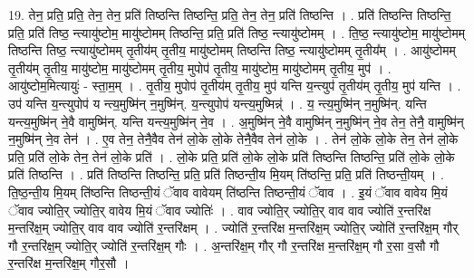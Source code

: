 \documentclass[17pt]{extarticle}
\begin{document}
19. तेन॒ प्रति॒ प्रति॒ तेन॒ तेन॒ प्रति॑ तिष्ठन्ति तिष्ठन्ति॒ प्रति॒ तेन॒ तेन॒ प्रति॑ तिष्ठन्ति । . प्रति॑ तिष्ठन्ति तिष्ठन्ति॒ प्रति॒ प्रति॑ तिष्ठ॒ न्त्यायु॑ष्टोम॒ मायु॑ष्टोमम् तिष्ठन्ति॒ प्रति॒ प्रति॑ तिष्ठ॒ न्त्यायु॑ष्टोमम् । . ति॒ष्ठ॒ न्त्यायु॑ष्टोम॒ मायु॑ष्टोमम् तिष्ठन्ति तिष्ठ॒ न्त्यायु॑ष्टोमम् तृ॒तीय॑म् तृ॒तीय॒ मायु॑ष्टोमम् तिष्ठन्ति तिष्ठ॒ न्त्यायु॑ष्टोमम् तृ॒तीय᳚म् । . आयु॑ष्टोमम् तृ॒तीय॑म् तृ॒तीय॒ मायु॑ष्टोम॒ मायु॑ष्टोमम् तृ॒तीय॒ मुपोप॑ तृ॒तीय॒ मायु॑ष्टोम॒ मायु॑ष्टोमम् तृ॒तीय॒ मुप॑ । . आयु॑ष्टोम॒मित्यायुः॑ - स्ता॒म॒म् । . तृ॒तीय॒ मुपोप॑ तृ॒तीय॑म् तृ॒तीय॒ मुप॑ यन्ति य॒न्त्युप॑ तृ॒तीय॑म् तृ॒तीय॒ मुप॑ यन्ति । . उप॑ यन्ति य॒न्त्युपोप॑ य न्त्य॒मुष्मि॑न् न॒मुष्मि॑न्. य॒न्त्युपोप॑ यन्त्य॒मुष्मिन्न्॑ । . य॒ न्त्य॒मुष्मि॑न् न॒मुष्मि॑न्. यन्ति यन्त्य॒मुष्मि॑न् ने॒वै वामुष्मि॑न्. यन्ति यन्त्य॒मुष्मि॑न् ने॒व । . अ॒मुष्मि॑न् ने॒वै वामुष्मि॑न् न॒मुष्मि॑न् ने॒व तेन॒ तेनै॒ वामुष्मि॑न् न॒मुष्मि॑न् ने॒व तेन॑ । . ए॒व तेन॒ तेनै॒वैव तेन॑ लो॒के लो॒के तेनै॒वैव तेन॑ लो॒के । . तेन॑ लो॒के लो॒के तेन॒ तेन॑ लो॒के प्रति॒ प्रति॑ लो॒के तेन॒ तेन॑ लो॒के प्रति॑ । . लो॒के प्रति॒ प्रति॑ लो॒के लो॒के प्रति॑ तिष्ठन्ति तिष्ठन्ति॒ प्रति॑ लो॒के लो॒के प्रति॑ तिष्ठन्ति । . प्रति॑ तिष्ठन्ति तिष्ठन्ति॒ प्रति॒ प्रति॑ तिष्ठन्ती॒य मि॒यम् ति॑ष्ठन्ति॒ प्रति॒ प्रति॑ तिष्ठन्ती॒यम् । . ति॒ष्ठ॒न्ती॒य मि॒यम् ति॑ष्ठन्ति तिष्ठन्ती॒यं ॅवाव वावेयम् ति॑ष्ठन्ति तिष्ठन्ती॒यं ॅवाव । . इ॒यं ॅवाव वावेय मि॒यं ॅवाव ज्योति॒र् ज्योति॒र् वावेय मि॒यं ॅवाव ज्योतिः॑ । . वाव ज्योति॒र् ज्योति॒र् वाव वाव ज्योति॑ र॒न्तरि॑क्ष म॒न्तरि॑क्ष॒म् ज्योति॒र् वाव वाव ज्योति॑ र॒न्तरि॑क्षम् । . ज्योति॑ र॒न्तरि॑क्ष म॒न्तरि॑क्ष॒म् ज्योति॒र् ज्योति॑ र॒न्तरि॑क्ष॒म् गौर् गौ र॒न्तरि॑क्ष॒म् ज्योति॒र् ज्योति॑ र॒न्तरि॑क्ष॒म् गौः । . अ॒न्तरि॑क्ष॒म् गौर् गौ र॒न्तरि॑क्ष म॒न्तरि॑क्ष॒म् गौ र॒सा व॒सौ गौ र॒न्तरि॑क्ष म॒न्तरि॑क्ष॒म् गौर॒सौ । \newline
\end{document}
